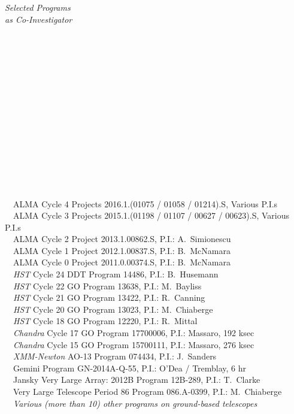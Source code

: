 \documentclass[11pt]{article}
\begin{document}
\hspace{2.5mm} \parbox{1.5in}{\textit{Selected Programs \\ as Co-Investigator \\\\\\\\\\\\\\\\\\\\\\\\\\\\\\}} \parbox{5.15in}{
\textbullet~~ALMA Cycle 4 Projects 2016.1.(01075 / 01058 / 01214).S, Various P.I.s\\
\textbullet~~ALMA Cycle 3 Projects 2015.1.(01198 / 01107 / 00627 / 00623).S, Various P.I.s\\
\textbullet~~ALMA Cycle 2 Project 2013.1.00862.S, P.I.: A.~Simionescu\\
\textbullet~~ALMA Cycle 1 Project 2012.1.00837.S, P.I.: B.~McNamara\\
\textbullet~~ALMA Cycle 0 Project 2011.0.00374.S, P.I.: B.~McNamara\\
\textbullet~~\textit{HST}  Cycle 24 DDT Program 14486, P.I.: B.~Husemann\\
\textbullet~~\textit{HST}  Cycle 22 GO Program 13638, P.I.: M.~Bayliss\\
\textbullet~~\textit{HST}  Cycle 21 GO Program 13422, P.I.: R.~Canning\\
\textbullet~~\textit{HST}  Cycle 20 GO Program 13023, P.I.: M.~Chiaberge\\
\textbullet~~\textit{HST}  Cycle 18 GO Program 12220, P.I.: R.~Mittal\\
\textbullet~~\textit{Chandra} Cycle 17 GO Program 17700006, P.I.: Massaro, 192 ksec\\
\textbullet~~\textit{Chandra} Cycle 15 GO Program 15700111, P.I.: Massaro, 276 ksec\\
\textbullet~~\textit{XMM-Newton}  AO-13 Program 074434, P.I.: J.~Sanders\\
\textbullet~~Gemini Program GN-2014A-Q-55, P.I.: O'Dea / Tremblay, 6 hr\\
\textbullet~~Jansky Very Large Array:  2012B Program 12B-289, P.I.: T.~Clarke\\
\textbullet~~Very Large Telescope Period 86 Program 086.A-0399, P.I.: M.~Chiaberge\\
\textbullet~~\textit{Various (more than 10) other programs on ground-based telescopes}
} \\
\end{document}
